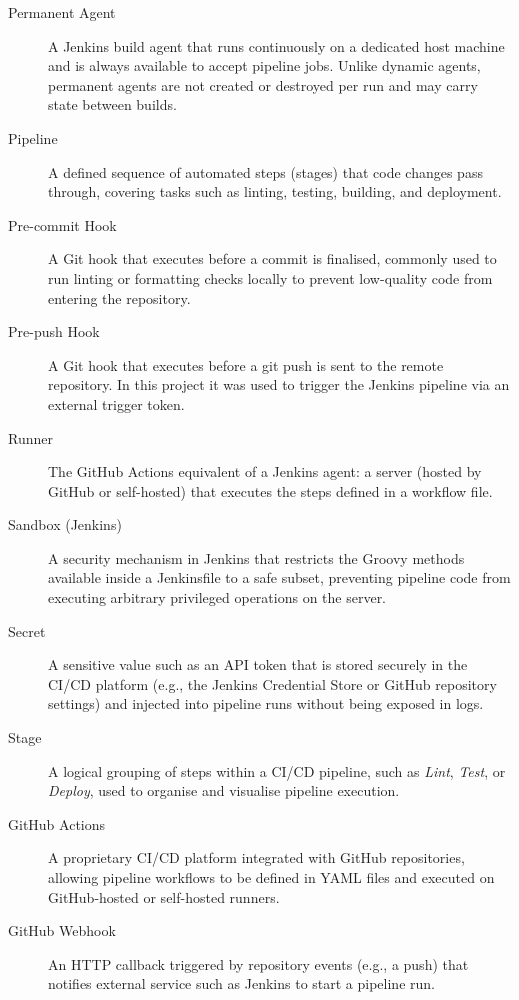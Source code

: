 \documentclass{llncs}
\begin{document}
\begin{description}
\item[Permanent Agent] A Jenkins build agent that runs continuously on a dedicated host machine and is always available to accept pipeline jobs. Unlike dynamic agents, permanent agents are not created or destroyed per run and may carry state between builds.

\item[Pipeline] A defined sequence of automated steps (stages) that code changes pass through, covering tasks such as linting, testing, building, and deployment.

\item[Pre-commit Hook] A Git hook that executes before a commit is finalised, commonly used to run linting or formatting checks locally to prevent low-quality code from entering the repository.

\item[Pre-push Hook] A Git hook that executes before a git push is sent to the remote repository. In this project it was used to trigger the Jenkins pipeline via an external trigger token.

\item[Runner] The GitHub Actions equivalent of a Jenkins agent: a server (hosted by GitHub or self-hosted) that executes the steps defined in a workflow file.

\item[Sandbox (Jenkins)] A security mechanism in Jenkins that restricts the Groovy methods available inside a Jenkinsfile to a safe subset, preventing pipeline code from executing arbitrary privileged operations on the server.

\item[Secret] A sensitive value such as an API token that is stored securely in the CI/CD platform (e.g., the Jenkins Credential Store or GitHub repository settings) and injected into pipeline runs without being exposed in logs.

\item[Stage] A logical grouping of steps within a CI/CD pipeline, such as \emph{Lint}, \emph{Test}, or \emph{Deploy}, used to organise and visualise pipeline execution.

\item[GitHub Actions] A proprietary CI/CD platform integrated with GitHub repositories, allowing pipeline workflows to be defined in YAML files and executed on GitHub-hosted or self-hosted runners.

\item[GitHub Webhook] An HTTP callback triggered by repository events (e.g., a push) that notifies external service such as Jenkins to start a pipeline run.


\end{description}
\end{document}
